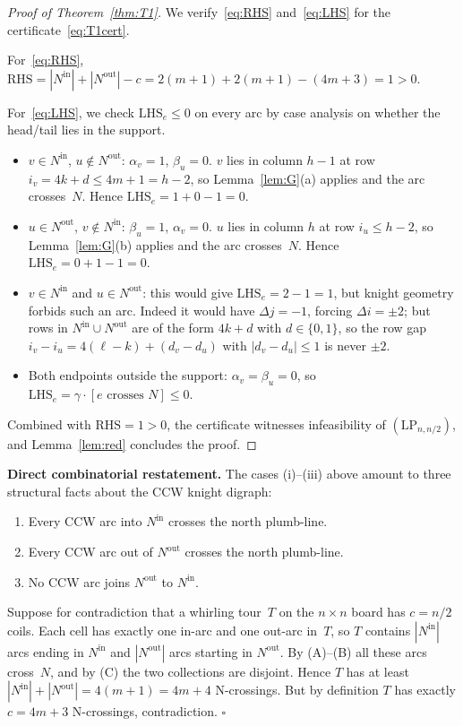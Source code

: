 \documentclass[11pt]{article}
\theoremstyle{plain}
\theoremstyle{remark}
\newcommand{\Nin}{N^{\mathrm{in}}}
\newcommand{\Nout}{N^{\mathrm{out}}}
\newcommand{\LHS}{\mathrm{LHS}}
\newcommand{\RHS}{\mathrm{RHS}}
\begin{document}
\begin{proof}[Proof of Theorem~\ref{thm:T1}]
We verify~\eqref{eq:RHS} and~\eqref{eq:LHS} for the
certificate~\eqref{eq:T1cert}.

For~\eqref{eq:RHS},
\(
  \RHS = |\Nin|+|\Nout|-c = 2(m+1)+2(m+1)-(4m+3) = 1>0.
\)

For~\eqref{eq:LHS}, we check $\LHS_e\le 0$ on every arc by
case analysis on whether the head/tail lies in the support.
\begin{itemize}
\item[(i)] $v\in\Nin$, $u\notin\Nout$:  $\alpha_v=1$, $\beta_u=0$.
$v$ lies in column $h-1$ at row $i_v=4k+d\le 4m+1=h-2$, so
Lemma~\ref{lem:G}(a) applies and the arc crosses~$N$.  Hence
$\LHS_e=1+0-1=0$.
\item[(ii)] $u\in\Nout$, $v\notin\Nin$:  $\beta_u=1$, $\alpha_v=0$.
$u$ lies in column $h$ at row $i_u\le h-2$, so Lemma~\ref{lem:G}(b)
applies and the arc crosses~$N$.  Hence $\LHS_e=0+1-1=0$.
\item[(iii)] $v\in\Nin$ and $u\in\Nout$:  this would give
$\LHS_e=2-1=1$, but knight geometry forbids such an arc.  Indeed it
would have $\Delta j=-1$, forcing $\Delta i=\pm 2$;  but rows in
$\Nin\cup\Nout$ are of the form $4k+d$ with $d\in\{0,1\}$, so the row
gap $i_v-i_u=4(\ell-k)+(d_v-d_u)$ with $|d_v-d_u|\le 1$ is never $\pm 2$.
\item[(iv)] Both endpoints outside the support:  $\alpha_v=\beta_u=0$,
so $\LHS_e=\gamma\cdot[e\text{ crosses }N]\le 0$.
\end{itemize}
Combined with $\RHS=1>0$, the certificate witnesses infeasibility of
$(\mathrm{LP}_{n,n/2})$, and Lemma~\ref{lem:red} concludes the proof.
\end{proof}

\medskip\noindent\textbf{Direct combinatorial restatement.}
The cases (i)--(iii) above amount to three structural facts about
the CCW knight digraph:
\begin{enumerate}
\item[(A)] Every CCW arc into $\Nin$ crosses the north plumb-line.
\item[(B)] Every CCW arc out of $\Nout$ crosses the north plumb-line.
\item[(C)] No CCW arc joins $\Nout$ to $\Nin$.
\end{enumerate}
Suppose for contradiction that a whirling tour~$T$ on the $n\times n$
board has $c=n/2$ coils.  Each cell has exactly one in-arc and one
out-arc in~$T$, so $T$ contains $|\Nin|$ arcs ending in $\Nin$ and
$|\Nout|$ arcs starting in $\Nout$.  By (A)--(B) all these arcs
cross~$N$, and by (C) the two collections are disjoint.  Hence $T$
has at least $|\Nin|+|\Nout|=4(m+1)=4m+4$ N-crossings.  But by
definition $T$ has exactly $c=4m+3$ N-crossings, contradiction.
\hfill$\square$
\end{document}
